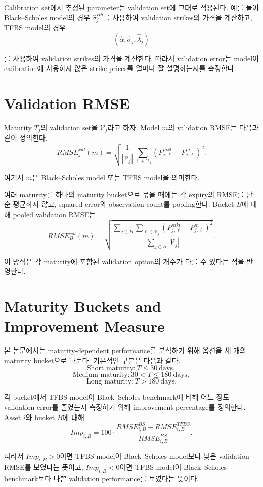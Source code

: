 \documentclass[11pt,a4paper]{report}
\begin{document}
Calibration set에서 추정된 parameter는 validation set에 그대로 적용된다. 예를 들어 Black--Scholes model의 경우 $\widehat{\sigma}_j^{BS}$를 사용하여 validation strikes의 가격을 계산하고, TFBS model의 경우
\[
(\widehat{\alpha},\widehat{\sigma}_j,\widehat{\lambda}_j)
\]

를 사용하여 validation strikes의 가격을 계산한다. 따라서 validation error는 model이 calibration에 사용하지 않은 strike prices를 얼마나 잘 설명하는지를 측정한다.

\section{Validation RMSE}

Maturity $T_j$의 validation set을 $\mathcal{V}_j$라고 하자. Model $m$의 validation RMSE는 다음과 같이 정의한다.
\[
RMSE_{j}^{val}(m)
=
\sqrt{
\frac{1}{|\mathcal{V}_j|}
\sum_{\ell\in\mathcal{V}_j}
\left(
P_{j,\ell}^{mkt}
-
P_{j,\ell}^{m}
\right)^2
}.
\]

여기서 $m$은 Black--Scholes model 또는 TFBS model을 의미한다.

여러 maturity를 하나의 maturity bucket으로 묶을 때에는 각 expiry의 RMSE를 단순 평균하지 않고, squared error와 observation count를 pooling한다. Bucket $B$에 대해 pooled validation RMSE는
\[
RMSE_{B}^{val}(m)
=
\sqrt{
\frac{
\sum_{j\in B}
\sum_{\ell\in\mathcal{V}_j}
\left(
P_{j,\ell}^{mkt}
-
P_{j,\ell}^{m}
\right)^2
}{
\sum_{j\in B}|\mathcal{V}_j|
}
}.
\]

이 방식은 각 maturity에 포함된 validation option의 개수가 다를 수 있다는 점을 반영한다.

\section{Maturity Buckets and Improvement Measure}

본 논문에서는 maturity-dependent performance를 분석하기 위해 옵션을 세 개의 maturity bucket으로 나눈다. 기본적인 구분은 다음과 같다.
\[
\text{Short maturity}
:
T\le 30\ \text{days},
\]
\[
\text{Medium maturity}
:
30<T\le 180\ \text{days},
\]
\[
\text{Long maturity}
:
T>180\ \text{days}.
\]

각 bucket에서 TFBS model이 Black--Scholes benchmark에 비해 어느 정도 validation error를 줄였는지 측정하기 위해 improvement percentage를 정의한다. Asset $i$와 bucket $B$에 대해
\[
Imp_{i,B}
=
100
\cdot
\frac{
RMSE_{i,B}^{BS}
-
RMSE_{i,B}^{TFBS}
}{
RMSE_{i,B}^{BS}
}.
\]

따라서 $Imp_{i,B}>0$이면 TFBS model이 Black--Scholes model보다 낮은 validation RMSE를 보였다는 뜻이고, $Imp_{i,B}<0$이면 TFBS model이 Black--Scholes benchmark보다 나쁜 validation performance를 보였다는 뜻이다.
\end{document}
